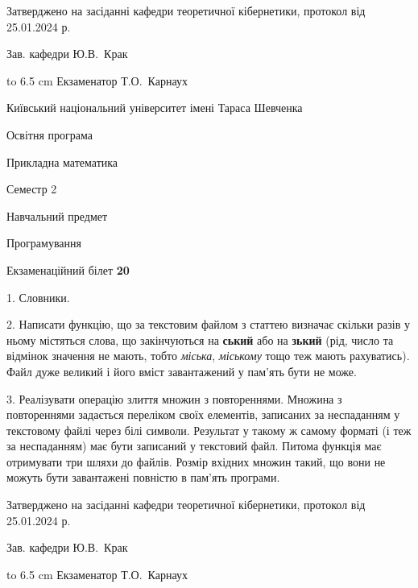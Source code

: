 \documentclass[12pt, ukrainian]{article}
\begin{document}
{\smallskip\smallskip \begin {scriptsize} Затверджено на засіданні кафедри теоретичної кібернетики, протокол   від   25.01.2024 р.\par\smallskip\smallskip\smallskip\smallskip
{\parbox {6.5 cm} {Зав. кафедри \dotfill Ю.В.~Крак}}\hspace {0.7cm} {\hbox to 6.5 cm { Екзаменатор \dotfill Т.О.~Карнаух}} \end{scriptsize}}
\vspace{0.9cm}
{{\begin {scriptsize}\par
{ \center  Київський національний університет імені Тараса Шевченка \par}
{\parbox {5 cm}{Освітня програма \hfill}{\parbox {7 cm}{Прикладна математика\hfill}}\parbox {6 cm}{\hfill Семестр 2}}\par
{\parbox {5 cm} {Навчальний предмет \hfill}\parbox {7 cm}{Програмування \hfill}\parbox {6cm}{\hfill}\par}\vspace{-15pt} \end{scriptsize}}{\center Екзаменаційний білет \No \textbf { 20 }\par}}
{%
1. Словники.%
\par
2. Написати функцію, що за текстовим файлом з статтею визначає  скільки разів у ньому містяться слова, що закінчуються на \textbf{ський} або на \textbf{зький} (рід, число та відмінок значення не мають, тобто \textit{міська}, \textit{міському} тощо теж мають рахуватись). Файл дуже великий і його вміст завантажений у пам'ять бути не може.

\par
3. Реалізувати операцію злиття множин з повтореннями. Множина з повтореннями задається переліком своїх елементів, записаних за неспаданням у текстовому файлі через білі символи. Результат у такому ж самому форматі (і теж за неспаданням) має бути записаний у текстовий файл. Питома функція має отримувати три шляхи до файлів. Розмір вхідних множин такий, що вони не можуть бути завантажені повністю в пам’ять програми.

}
{\smallskip\smallskip \begin {scriptsize} Затверджено на засіданні кафедри теоретичної кібернетики, протокол   від   25.01.2024 р.\par\smallskip\smallskip\smallskip\smallskip
{\parbox {6.5 cm} {Зав. кафедри \dotfill Ю.В.~Крак}}\hspace {0.7cm} {\hbox to 6.5 cm { Екзаменатор \dotfill Т.О.~Карнаух}} \end{scriptsize}}
\end{document}
